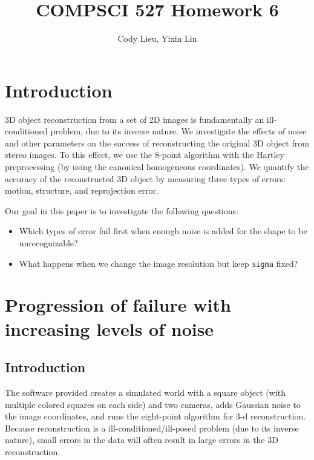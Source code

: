 \documentclass{article}
\author{Cody Lieu, Yixin Lin}
\title{COMPSCI 527 Homework 6}
\begin{document}
\maketitle

% 


\section{Introduction}

3D object reconstruction from a set of 2D images is fundamentally an ill-conditioned problem, due to its inverse nature. We investigate the effects of noise and other parameters on the success of reconstructing the original 3D object from stereo images. To this effect, we use the 8-point algorithm with the Hartley preprocessing\cite{hartley} (by using the canonical homogeneous coordinates). We quantify the accuracy of the reconstructed 3D object by measuring three types of errors: motion, structure, and reprojection error.

Our goal in this paper is to investigate the following questions:
\begin{itemize}
\item Which types of error fail first when enough noise is added for the shape to be unrecognizable? 
\item What happens when we change the image resolution but keep \texttt{sigma} fixed?
\end{itemize}

\section{Progression of failure with increasing levels of noise}

\subsection{Introduction}

The software provided creates a simulated world with a square object (with multiple colored squares on each side) and two cameras, adds Gaussian noise to the image coordinates, and runs the eight-point algorithm for 3-d reconstruction. Because reconstruction is a ill-conditioned/ill-posed problem (due to its inverse nature), small errors in the data will often result in large errors in the 3D reconstruction. 
\end{document}
